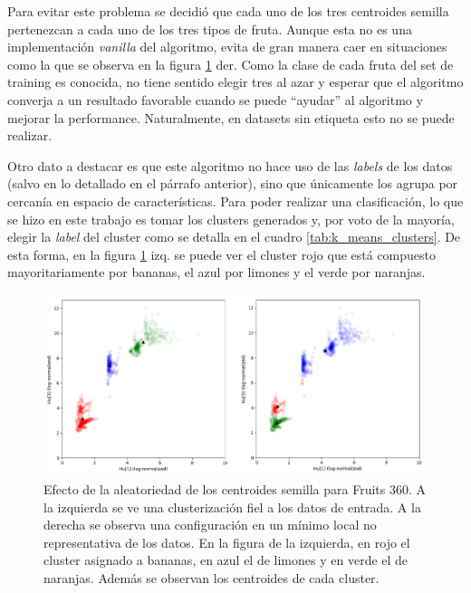\documentclass[10pt, a4paper]{article}
\begin{document}
Para evitar este problema se decidió que cada uno de los tres centroides semilla pertenezcan a cada uno de los tres tipos de fruta. Aunque esta no es una implementación \textit{vanilla} del algoritmo, evita de gran manera caer en situaciones como la que se observa en la figura \ref{fig:means_comparison} der. Como la clase de cada fruta del set de training es conocida, no tiene sentido elegir tres al azar y esperar que el algoritmo converja a un resultado favorable cuando se puede ``ayudar'' al algoritmo y mejorar la performance. Naturalmente, en datasets sin etiqueta esto no se puede realizar. 

Otro dato a destacar es que este algoritmo no hace uso de las \textit{labels} de los datos (salvo en lo detallado en el párrafo anterior), sino que únicamente los agrupa por cercanía en espacio de características. Para poder realizar una clasificación, lo que se hizo en este trabajo es tomar los clusters generados y, por voto de la mayoría, elegir la \textit{label} del cluster como se detalla en el cuadro \ref{tab:k_means_clusters}. De esta forma, en la figura \ref{fig:means_comparison} izq. se puede ver el cluster rojo que está compuesto mayoritariamente por bananas, el azul por limones y el verde por naranjas.  

\begin{figure}[h]
    \centering
    \includegraphics[width=\textwidth]{means_cluster_comparison.png}
    \caption{Efecto de la aleatoriedad de los centroides semilla para Fruits 360. A la izquierda se ve una clusterización fiel a los datos de entrada. A la derecha se observa una configuración en un mínimo local no representativa de los datos. En la figura de la izquierda, en rojo el cluster asignado a bananas, en azul el de limones y en verde el de naranjas. Además se observan los centroides de cada cluster.}
    \label{fig:means_comparison}
\end{figure}
\end{document}
